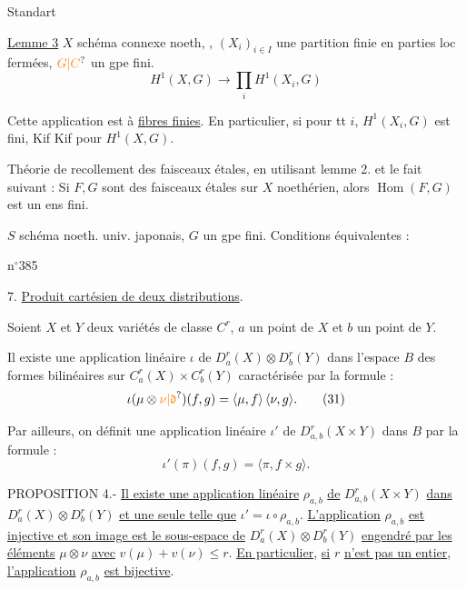 Standart

\uline{Lemme 3} $X$ schéma connexe  noeth, , $(X_i)_{i\in I}$ une partition finie en parties loc fermées, $\unsure{G|C}$ un gpe fini.  
\[
H^1(X,G)\longrightarrow\prod_i H^1(X_i,G)
\]

Cette application est à \uline{fibres finies}. En particulier, si pour tt $i$, $H^1(X_i,G)$ est fini, Kif Kif pour $H^1(X,G)$.

Théorie de recollement des faisceaux étales, en utilisant lemme 2. et le fait suivant :
 Si $F,G$ sont des faisceaux  étales  sur $X$ noethérien, alors $\operatorname{Hom}(F,G)$ est un ens fini.
\margin{$\big|$}

   $S$  schéma noeth. univ. japonais, $G$ un gpe fini. Conditions équivalentes :

n$^{\circ}$385

7. \uline{Produit cartésien de deux distributions}.

Soient $X$ et $Y$ deux variétés de classe $C^r$, $a$ un point de $X$ et $b$ un point de $Y$.

Il existe une application linéaire $\iota$ de $D_a^r(X)\otimes D_b^r(Y)$ dans l'espace $B$ des formes bilinéaires sur $C_a^r(X)\times C_b^r(Y)$ caractérisée par la formule :
\[
\iota(\mu\otimes\unsure{\nu|\mathfrak{d}})(f,g)=\langle\mu,f\rangle\,\langle\nu,g\rangle.\tag*{(31)}
\]

Par ailleurs, on définit une application linéaire $\iota'$ de $D_{a,b}^r(X\times Y)$ dans $B$ par la formule :
\[
\iota'(\pi)(f,g)=\langle\pi,f\times g\rangle.\tag*{(32)}
\]

PROPOSITION 4.- \uline{Il existe une application linéaire} $\rho_{a,b}$ \uline{de} $D_{a,b}^r(X\times Y)$ \uline{dans} $D_a^r(X)\otimes D_b^r(Y)$ \uline{et une seule telle que} $\iota'=\iota\circ\rho_{a,b}$. \uline{L'application} $\rho_{a,b}$ \uline{est injective et son image est le sous-espace de} $D_a^r(X)\otimes D_b^r(Y)$ \uline{engendré par les éléments} $\mu\otimes\nu$ \uline{avec} $v(\mu)+v(\nu)\leq r$. \uline{En particulier}, \uline{si} $r$ \uline{n'est pas un entier}, \uline{l'application} $\rho_{a,b}$ \uline{est bijective}.

